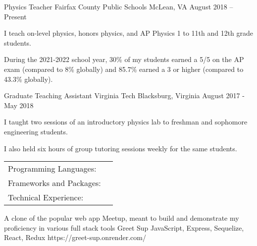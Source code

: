 \documentclass[]{awesome-cv}
\begin{document}
\begin{cventries}
	\cventry
	{Physics Teacher}
	{Fairfax County Public Schools}
	{McLean, VA}
	{August 2018 – Present}
	{\begin{cvitems}
		\item {I teach on-level physics, honors physics, and AP Physics 1 to 11th and 12th grade students.}
		\item {During the 2021-2022 school year, 30\% of my students earned a 5/5 on the AP exam (compared to 8\% globally) and 85.7\% earned a 3 or higher (compared to 43.3\% globally).}
		\end{cvitems}}
	\cventry
	{Graduate Teaching Assistant}
	{Virginia Tech}
	{Blacksburg, Virginia}
	{August 2017 - May 2018}
	{\begin{cvitems}
		\item {I taught two sessions of an introductory physics lab to freshman and sophomore engineering students.}
		\item {I also held six hours of group tutoring sessions weekly for the same students.}
		\end{cvitems}}
\end{cventries}
\begin{cventries}
	\cventry
	{}
	{\def\arraystretch{1.15}{\begin{tabular}{ l l }
		Programming Languages:  & {\skill{ JS and Python -- proficient; Java and C -- novice}} \\
		Frameworks and Packages:  & {\skill{ Express, React/Redux, Sequelize, Flask}} \\
		Technical Experience: & {\skill{Linux and Linux command line, }}\\
		\end{tabular}}}
	{}
	{}
	{}
\end{cventries}
\vspace{-7mm}
\begin{cventries}
	\cventry
	{A clone of the popular web app Meetup, meant to build and demonstrate my proficiency in various full stack tools}
	{Greet Sup}
	{JavaScript, Express, Sequelize, React, Redux}
	{https://greet-sup.onrender.com/}
	{}
	\vspace{-5mm}
\end{cventries}
\ 
\end{document}
